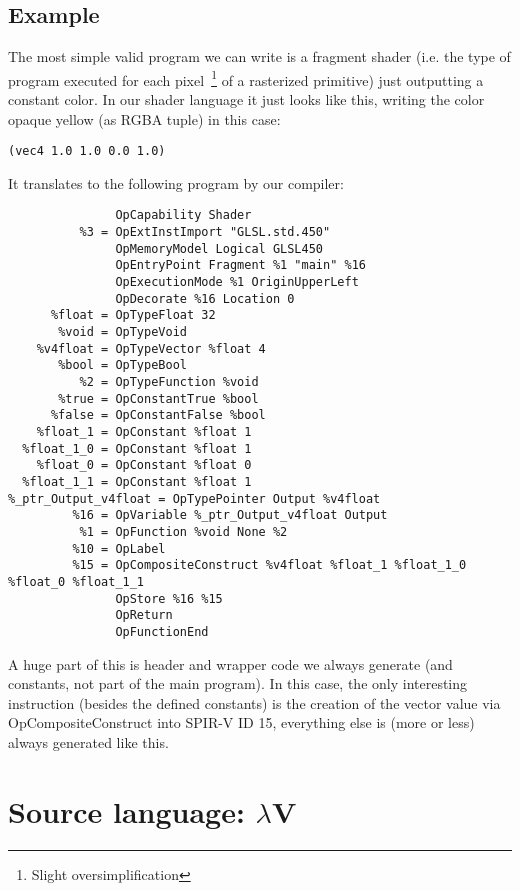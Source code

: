 \documentclass[letterpaper,12pt]{article}
\begin{document}
\subsection{Example}

The most simple valid program we can write is a fragment
shader (i.e. the type of program executed for each pixel~\footnote{Slight
oversimplification} of a
rasterized primitive) just outputting a constant color.
In our shader language it just looks like this, writing the
color opaque yellow (as RGBA tuple) in this case:

\begin{lstlisting}
(vec4 1.0 1.0 0.0 1.0)
\end{lstlisting}

\noindent It translates to the following program by our compiler:

\begin{lstlisting}
               OpCapability Shader
          %3 = OpExtInstImport "GLSL.std.450"
               OpMemoryModel Logical GLSL450
               OpEntryPoint Fragment %1 "main" %16
               OpExecutionMode %1 OriginUpperLeft
               OpDecorate %16 Location 0
      %float = OpTypeFloat 32
       %void = OpTypeVoid
    %v4float = OpTypeVector %float 4
       %bool = OpTypeBool
          %2 = OpTypeFunction %void
       %true = OpConstantTrue %bool
      %false = OpConstantFalse %bool
    %float_1 = OpConstant %float 1
  %float_1_0 = OpConstant %float 1
    %float_0 = OpConstant %float 0
  %float_1_1 = OpConstant %float 1
%_ptr_Output_v4float = OpTypePointer Output %v4float
         %16 = OpVariable %_ptr_Output_v4float Output
          %1 = OpFunction %void None %2
         %10 = OpLabel
         %15 = OpCompositeConstruct %v4float %float_1 %float_1_0 %float_0 %float_1_1
               OpStore %16 %15
               OpReturn
               OpFunctionEnd
\end{lstlisting}

A huge part of this is header and wrapper code we always generate
(and constants, not part of the main program). In this case,
the only interesting instruction (besides the defined constants)
is the creation of the vector value via OpCompositeConstruct into
SPIR-V ID 15, everything else is (more or less) always generated like
this.

\section{Source language: $\lambda$V}
\end{document}
